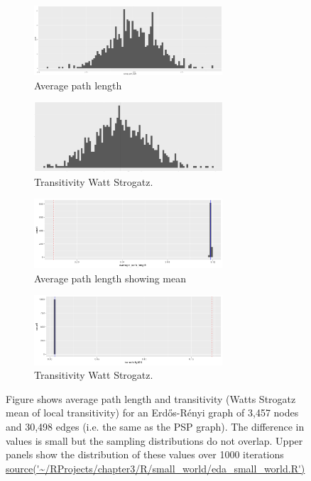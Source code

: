 \begin{figure}
  \begin{subfigure}{7cm}
    \centering\includegraphics[width=7cm]{images/chapter3/small_world_histogram/Rplot_average_path_length.png}
    \caption{Average path length}
    \end{subfigure}
  \begin{subfigure}{7cm}
    \centering\includegraphics[width=7cm]{images/chapter3/small_world_histogram/Rplot_transitivityWS_ER_graph3457.png}
    \caption{Transitivity Watt Strogatz.}
  \end{subfigure}

 
 \begin{subfigure}{7cm}
    \centering\includegraphics[width=7cm]{images/chapter3/small_world_histogram/Rplot_average_pathlmean.png}
    \caption{Average path length showing mean}
    \end{subfigure}
  \begin{subfigure}{7cm}
    \centering\includegraphics[width=7cm]{images/chapter3/small_world_histogram/Rplot_transitivity_mean.png}
    \caption{Transitivity Watt Strogatz.}
  \end{subfigure}
\caption{Figure shows average path length and transitivity (Watts Strogatz mean of local transitivity) for an Erd\H{o}s-R\'enyi graph of 3,457 nodes and 30,498 edges (i.e. the same as the PSP graph). The difference in values is small but the sampling distributions do not overlap. Upper panels show the distribution of these values over 1000 iterations \url{source('~/RProjects/chapter3/R/small_world/eda_small_world.R')}}
 
  \end{figure}

